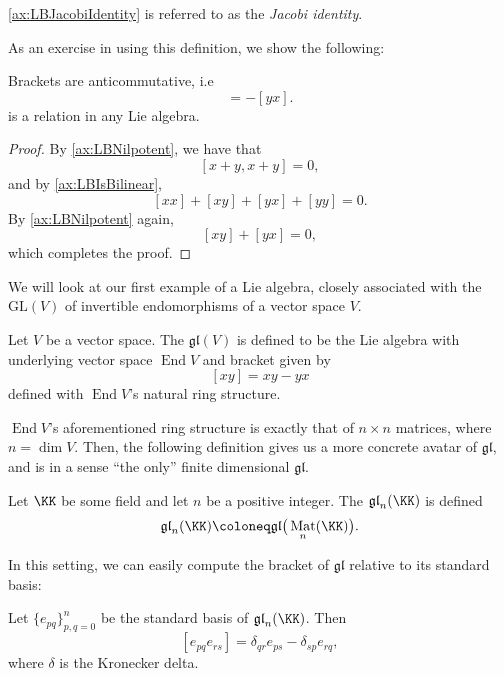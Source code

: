 \documentclass{article}
\newcommand{\lb}[1]{\ensuremath{\left[{#1}\right]}}
\DeclareMathOperator{\End}{End}
\DeclareMathOperator{\Mat}{Mat}
\newcommand{\GL}{\ensuremath{\text{GL}}}
\newcommand{\glalg}{\ensuremath{\mathfrak{gl}}}
\begin{document}
\ref{ax:LBJacobiIdentity} is referred to as the \textit{Jacobi identity}.

As an exercise in using this definition, we show the following:

\begin{proposition}
    Brackets are anticommutative, i.e
    \begin{equation}
        [xy]
        =
        -[yx].
        \tag{L2'}
    \end{equation}
    is a relation in any Lie algebra.
\end{proposition}
\begin{proof}
    By \ref{ax:LBNilpotent}, we have that
    \[
        \lb{x+y,x+y}
        =
        0,
    \]
    and by \ref{ax:LBIsBilinear},
    \[
        \lb{xx} + \lb{xy} + \lb{yx} + \lb{yy}
        =
        0.
    \]
    By \ref{ax:LBNilpotent} again,
    \[
        \lb{xy} + \lb{yx}
        =
        0,
    \]
    which completes the proof.
\end{proof}

We will look at our first example of a Lie algebra, closely associated with the  $\GL(V)$ of invertible endomorphisms of a vector space $V$.

\begin{definition}[$\glalg$, abstractly]
    Let $V$ be a vector space.
    The  $\glalg(V)$ is defined to be the Lie algebra with underlying vector space $\End V$ and bracket given by
    \[
        \lb{xy}
        =
        xy - yx
    \]
    defined with $\End V$'s natural ring structure.
\end{definition}

    $\End V$'s aforementioned ring structure is exactly that of $n \times n$ matrices, where $n = \dim V$.
    Then, the following definition gives us a more concrete avatar of $\glalg$, and is in a sense ``the only'' finite dimensional $\glalg$.

\begin{definition}[$\glalg$, concretely]
    Let $\KK$ be some field and let $n$ be a positive integer.
    The  $\glalg_n(\KK)$ is defined
    \[
        \glalg_n(\KK)
        \coloneq
        \glalg\big(\Mat_n(\KK)\big).
    \]
\end{definition}

In this setting, we can easily compute the bracket of $\glalg$ relative to its standard basis:

\begin{proposition}
    Let $\{e_{pq}\}_{p,q = 0}^n$ be the standard basis of $\glalg_n(\KK)$.
    Then
    \[
        \lb{e_{pq}e_{rs}}
        =
        \delta_{qr}e_{ps}
        -
        \delta_{sp}e_{rq},
    \]
    where $\delta$ is the Kronecker delta.
\end{proposition}
\end{document}
